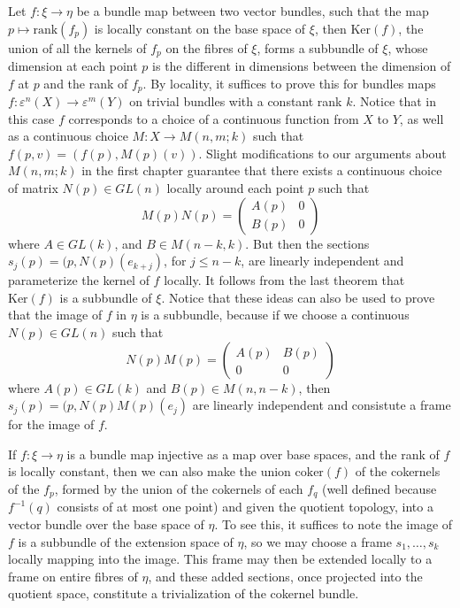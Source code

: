 \begin{example}
    Let $f: \xi \to \eta$ be a bundle map between two vector bundles, such that the map $p \mapsto \text{rank}(f_p)$ is locally constant on the base space of $\xi$, then $\text{Ker}(f)$, the union of all the kernels of $f_p$ on the fibres of $\xi$, forms a subbundle of $\xi$, whose dimension at each point $p$ is the different in dimensions between the dimension of $f$ at $p$ and the rank of $f_p$. By locality, it suffices to prove this for bundles maps $f: \varepsilon^n(X) \to \varepsilon^m(Y)$ on trivial bundles with a constant rank $k$. Notice that in this case $f$ corresponds to a choice of a continuous function from $X$ to $Y$, as well as a continuous choice $M: X \to M(n,m;k)$ such that $f(p,v) = (f(p), M(p)(v))$. Slight modifications to our arguments about $M(n,m;k)$ in the first chapter guarantee that there exists a continuous choice of matrix $N(p) \in GL(n)$ locally around each point $p$ such that
    \[ M(p)N(p) = \begin{pmatrix} A(p) & 0 \\ B(p) & 0 \end{pmatrix} \]
    where $A \in GL(k)$, and $B \in M(n-k,k)$. But then the sections $s_j(p) = (p, N(p)(e_{k+j})$, for $j \leq n-k$, are linearly independent and parameterize the kernel of $f$ locally. It follows from the last theorem that $\text{Ker}(f)$ is a subbundle of $\xi$. Notice that these ideas can also be used to prove that the image of $f$ in $\eta$ is a subbundle, because if we choose a continuous $N(p) \in GL(n)$ such that
    \[ N(p)M(p) = \begin{pmatrix} A(p) & B(p) \\ 0 & 0 \end{pmatrix} \]
    where $A(p) \in GL(k)$ and $B(p) \in M(n,n-k)$, then $s_j(p) = (p, N(p)M(p)(e_j)$ are linearly independent and consistute a frame for the image of $f$.
\end{example}

\begin{example}
    If $f: \xi \to \eta$ is a bundle map injective as a map over base spaces, and the rank of $f$ is locally constant, then we can also make the union $\text{coker}(f)$ of the cokernels of the $f_p$, formed by the union of the cokernels of each $f_q$ (well defined because $f^{-1}(q)$ consists of at most one point) and given the quotient topology, into a vector bundle over the base space of $\eta$. To see this, it suffices to note the image of $f$ is a subbundle of the extension space of $\eta$, so we may choose a frame $s_1, \dots, s_k$ locally mapping into the image. This frame may then be extended locally to a frame on entire fibres of $\eta$, and these added sections, once projected into the quotient space, constitute a trivialization of the cokernel bundle.
\end{example}

